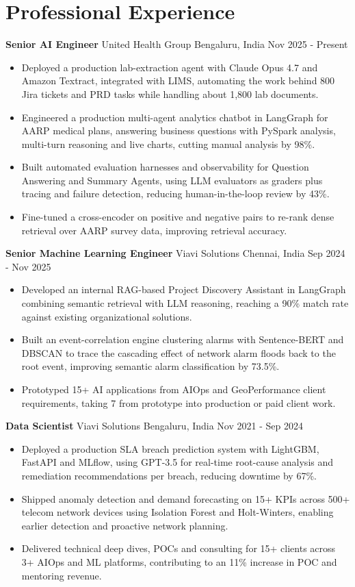 \documentclass[10pt,a4paper]{article}
\newcommand{\role}[4]{\textbf{#1} \textbar{} #2 \hfill #3 \textbar{} #4\par}
\begin{document}
\section{Professional Experience}
\role{Senior AI Engineer}{United Health Group}{Bengaluru, India}{Nov 2025 - Present}
\begin{itemize}
  \item Deployed a production lab-extraction agent with Claude Opus 4.7 and Amazon Textract, integrated with LIMS, automating the work behind 800 Jira tickets and PRD tasks while handling about 1,800 lab documents.
  \item Engineered a production multi-agent analytics chatbot in LangGraph for AARP medical plans, answering business questions with PySpark analysis, multi-turn reasoning and live charts, cutting manual analysis by 98\%.
  \item Built automated evaluation harnesses and observability for Question Answering and Summary Agents, using LLM evaluators as graders plus tracing and failure detection, reducing human-in-the-loop review by 43\%.
  \item Fine-tuned a cross-encoder on positive and negative pairs to re-rank dense retrieval over AARP survey data, improving retrieval accuracy.
\end{itemize}
\vspace{3pt}
\role{Senior Machine Learning Engineer}{Viavi Solutions}{Chennai, India}{Sep 2024 - Nov 2025}
\begin{itemize}
  \item Developed an internal RAG-based Project Discovery Assistant in LangGraph combining semantic retrieval with LLM reasoning, reaching a 90\% match rate against existing organizational solutions.
  \item Built an event-correlation engine clustering alarms with Sentence-BERT and DBSCAN to trace the cascading effect of network alarm floods back to the root event, improving semantic alarm classification by 73.5\%.
  \item Prototyped 15+ AI applications from AIOps and GeoPerformance client requirements, taking 7 from prototype into production or paid client work.
\end{itemize}
\vspace{3pt}
\role{Data Scientist}{Viavi Solutions}{Bengaluru, India}{Nov 2021 - Sep 2024}
\begin{itemize}
  \item Deployed a production SLA breach prediction system with LightGBM, FastAPI and MLflow, using GPT-3.5 for real-time root-cause analysis and remediation recommendations per breach, reducing downtime by 67\%.
  \item Shipped anomaly detection and demand forecasting on 15+ KPIs across 500+ telecom network devices using Isolation Forest and Holt-Winters, enabling earlier detection and proactive network planning.
  \item Delivered technical deep dives, POCs and consulting for 15+ clients across 3+ AIOps and ML platforms, contributing to an 11\% increase in POC and mentoring revenue.
\end{itemize}
\end{document}
